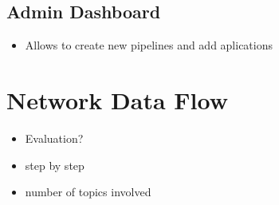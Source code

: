 \subsection{Admin Dashboard}
\begin{itemize}
    \item Allows to create new pipelines and add aplications 
\end{itemize}

\section{Network Data Flow}
\begin{itemize}
    \item Evaluation?
    \item step by step
    \item number of topics involved
\end{itemize}
